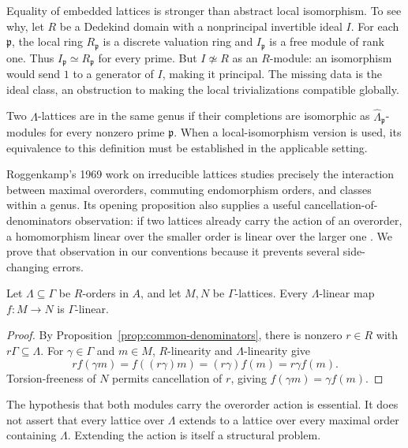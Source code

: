 Equality of embedded lattices is stronger than abstract local
isomorphism. To see why, let $R$ be a Dedekind domain with a
nonprincipal invertible ideal $I$. For each $\mathfrak p$, the
local ring $R_{\mathfrak p}$ is a discrete valuation ring and
$I_{\mathfrak p}$ is a free module of rank one. Thus
$I_{\mathfrak p}\simeq R_{\mathfrak p}$ for every prime. But
$I\not\simeq R$ as an $R$-module: an isomorphism would send
$1$ to a generator of $I$, making it principal. The missing data
is the ideal class, an obstruction to making the local
trivializations compatible globally.

\begin{definition}[Genus]
Two $\Lambda$-lattices are in the same genus if their completions
are isomorphic as $\widehat\Lambda_{\mathfrak p}$-modules for
every nonzero prime $\mathfrak p$. When a local-isomorphism version
is used, its equivalence to this definition must be established in
the applicable setting.
\end{definition}

Roggenkamp's 1969 work on irreducible lattices studies precisely the
interaction between maximal overorders, commuting endomorphism
orders, and classes within a genus. Its opening proposition also
supplies a useful cancellation-of-denominators observation: if two
lattices already carry the action of an overorder, a homomorphism
linear over the smaller order is linear over the larger one
\cite[Prop.~1]{Roggenkamp1969Irreducible}. We prove that observation
in our conventions because it prevents several side-changing errors.

\begin{lemma}
Let $\Lambda\subseteq\Gamma$ be $R$-orders in $A$, and let
$M,N$ be $\Gamma$-lattices. Every $\Lambda$-linear map
$f:M\to N$ is $\Gamma$-linear.
\end{lemma}

\begin{proof}
By Proposition~\ref{prop:common-denominators}, there is nonzero
$r\in R$ with $r\Gamma\subseteq\Lambda$. For
$\gamma\in\Gamma$ and $m\in M$, $R$-linearity and
$\Lambda$-linearity give
\[
 r f(\gamma m)=f((r\gamma)m)=(r\gamma)f(m)
             =r\gamma f(m).
\]
Torsion-freeness of $N$ permits cancellation of $r$, giving
$f(\gamma m)=\gamma f(m)$.
\end{proof}

The hypothesis that both modules carry the overorder action is
essential. It does not assert that every lattice over $\Lambda$
extends to a lattice over every maximal order containing $\Lambda$.
Extending the action is itself a structural problem.

